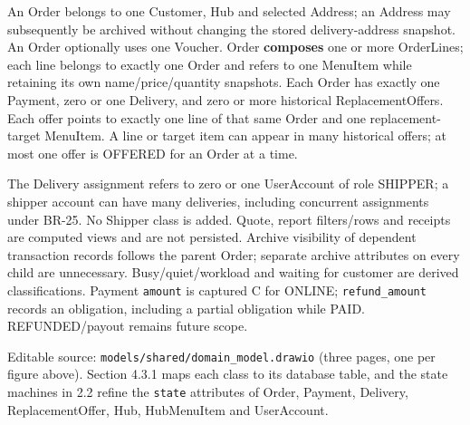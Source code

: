 An Order belongs to one Customer, Hub and selected Address; an Address may subsequently be archived without changing the stored delivery-address snapshot. An Order optionally uses one Voucher. Order \textbf{composes} one or more OrderLines; each line belongs to exactly one Order and refers to one MenuItem while retaining its own name/price/quantity snapshots. Each Order has exactly one Payment, zero or one Delivery, and zero or more historical ReplacementOffers. Each offer points to exactly one line of that same Order and one replacement-target MenuItem. A line or target item can appear in many historical offers; at most one offer is OFFERED for an Order at a time.

The Delivery assignment refers to zero or one UserAccount of role SHIPPER; a shipper account can have many deliveries, including concurrent assignments under BR-25. No Shipper class is added. Quote, report filters/rows and receipts are computed views and are not persisted. Archive visibility of dependent transaction records follows the parent Order; separate archive attributes on every child are unnecessary. Busy/quiet/workload and waiting for customer are derived classifications. Payment \texttt{amount} is captured C for ONLINE; \texttt{refund\_\allowbreak{}amount} records an obligation, including a partial obligation while PAID. REFUNDED/payout remains future scope.

Editable source: \texttt{models/\allowbreak{}shared/\allowbreak{}domain\_\allowbreak{}model.\allowbreak{}drawio} (three pages, one per figure above). Section 4.3.1 maps each class to its database table, and the state machines in 2.2 refine the \texttt{state} attributes of Order, Payment, Delivery, ReplacementOffer, Hub, HubMenuItem and UserAccount.
